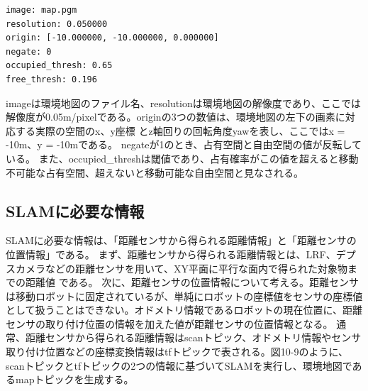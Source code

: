 \begin{lstlisting}[language=ROS]
image: map.pgm
resolution: 0.050000
origin: [-10.000000, -10.000000, 0.000000]
negate: 0
occupied_thresh: 0.65
free_thresh: 0.196
\end{lstlisting}

imageは環境地図のファイル名、resolutionは環境地図の解像度であり、ここでは解像度が0.05m/pixelである。originの3つの数値は、環境地図の左下の画素に対応する実際の空間のx、y座標  とz軸回りの回転角度yawを表し、ここではx = -10m、y = -10mである。 negateが1のとき、占有空間と自由空間の値が反転している。  また、occupied\_threshは閾値であり、占有確率がこの値を超えると移動不可能な占有空間、超えないと移動可能な自由空間と見なされる。

\subsection{SLAMに必要な情報}

SLAMに必要な情報は、「距離センサから得られる距離情報」と「距離センサの位置情報」である。
まず、距離センサから得られる距離情報とは、LRF、デプスカメラなどの距離センサを用いて、XY平面に平行な面内で得られた対象物までの距離値  である。
次に、距離センサの位置情報について考える。距離センサは移動ロボットに固定されているが、単純にロボットの座標値をセンサの座標値として扱うことはできない。オドメトリ情報であるロボットの現在位置に、距離センサの取り付け位置の情報を加えた値が距離センサの位置情報となる。
通常、距離センサから得られる距離情報はscanトピック、オドメトリ情報やセンサ取り付け位置などの座標変換情報はtfトピックで表される。図10-9のように、scanトピックとtfトピックの2つの情報に基づいてSLAMを実行し、環境地図であるmapトピックを生成する。

